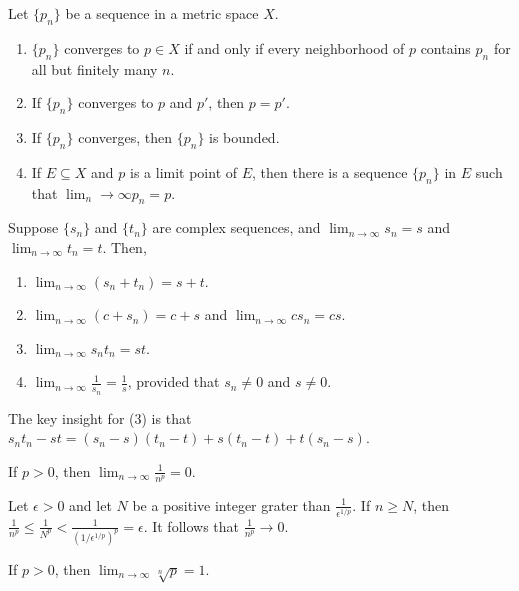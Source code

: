 \documentclass{mathnotes}
\begin{document}
\begin{prop}
  Let $\{p_n\}$ be a sequence in a metric space $X$.
  \begin{enumerate}
    \item $\{p_n\}$ converges to $p\in X$ if and only if every neighborhood of
      $p$ contains $p_n$ for all but finitely many $n$.
    \item If $\{p_n\}$ converges to $p$ and $p'$, then $p=p'$.
    \item If $\{p_n\}$ converges, then $\{p_n\}$ is bounded.
    \item If $E\subseteq X$ and $p$ is a limit point of $E$, then there is a
      sequence $\{p_n\}$ in $E$ such that $\lim_n\to\infty p_n=p$.
  \end{enumerate}
\end{prop}

\begin{prop}
  Suppose $\{s_n\}$ and $\{t_n\}$ are complex sequences, and
  $\lim_{n\to\infty}s_n=s$ and $\lim_{n\to\infty}t_n=t$. Then,
  \begin{enumerate}
    \item $\lim_{n\to\infty}(s_n+t_n)=s+t$.
    \item $\lim_{n\to\infty}(c+s_n)=c+s$ and $\lim_{n\to\infty}cs_n=cs$.
    \item $\lim_{n\to\infty}s_nt_n=st$.
    \item $\lim_{n\to\infty}\frac{1}{s_n}=\frac{1}{s}$, provided that
      $s_n\neq0$ and $s\neq0$.
  \end{enumerate}
\end{prop}

\begin{pfi}
  The key insight for (3) is that $s_nt_n-st=(s_n-s)(t_n-t)+s(t_n-t)+t(s_n-s)$.
\end{pfi}

\begin{prop}
  If $p>0$, then $\lim_{n\to\infty}\frac{1}{n^p}=0$.
\end{prop}

\begin{pf}
  Let $\epsilon>0$ and let $N$ be a positive integer grater than
  $\frac{1}{\epsilon^{1/p}}$. If $n\ge N$, then
  $\frac{1}{n^p}\le\frac{1}{N^p}<\frac{1}{(1/\epsilon^{1/p})^p}=\epsilon$. It
  follows that $\frac{1}{n^p}\to0$.
\end{pf}

\begin{prop}
  If $p>0$, then $\lim_{n\to\infty}\sqrt[n]{p}=1$.
\end{prop}
\end{document}
